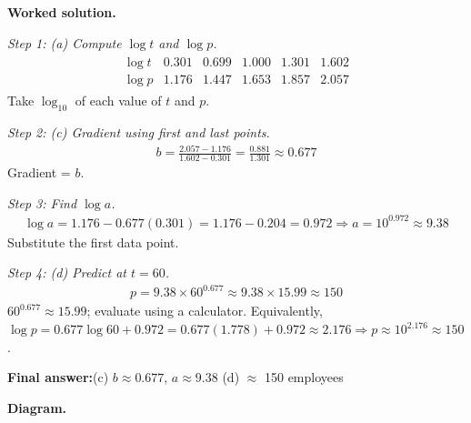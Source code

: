 \documentclass[11pt]{article}
\begin{document}
\textbf{Worked solution.}

\textit{Step 1: (a) Compute \( \log t \) and \( \log p \).}
\[\begin{gathered}
\begin{array}{c|c|c|c|c|c} \log t & 0.301 & 0.699 & 1.000 & 1.301 & 1.602 \\ \log p & 1.176 & 1.447 & 1.653 & 1.857 & 2.057 \end{array}
\end{gathered}\]
Take \( \log_{10} \) of each value of \( t \) and \( p \).

\textit{Step 2: (c) Gradient using first and last points.}
\[\begin{gathered}
b = \frac{2.057 - 1.176}{1.602 - 0.301} = \frac{0.881}{1.301} \approx 0.677
\end{gathered}\]
Gradient = \( b \).

\textit{Step 3: Find \( \log a \).}
\[\begin{gathered}
\log a = 1.176 - 0.677(0.301) = 1.176 - 0.204 = 0.972 \Rightarrow a = 10^{0.972} \approx 9.38
\end{gathered}\]
Substitute the first data point.

\textit{Step 4: (d) Predict at \( t = 60 \).}
\[\begin{gathered}
p = 9.38 \times 60^{0.677} \approx 9.38 \times 15.99 \approx 150
\end{gathered}\]
\( 60^{0.677} \approx 15.99 \); evaluate using a calculator. Equivalently, \( \log p = 0.677\log 60 + 0.972 = 0.677(1.778) + 0.972 \approx 2.176 \Rightarrow p \approx 10^{2.176} \approx 150 \).

\begin{answerbox}
\textbf{Final answer:}\quad (c) \(\displaystyle  b \approx 0.677 \), \(\displaystyle  a \approx 9.38 \) \quad  (d) $\approx$ 150  employees
\end{answerbox}
\textbf{Diagram.}
\end{document}
